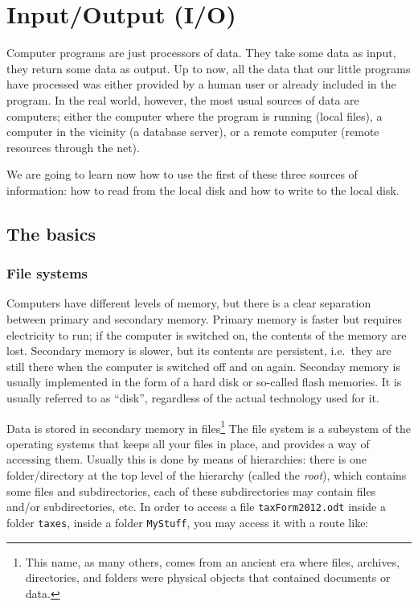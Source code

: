 
\section{Input/Output (I/O)}
\label{sec:inputoutput-io}

Computer programs are just processors of data. They take some data as
input, they return some data as output. Up to now, all the data that
our little programs have processed was either provided by a human user
or already included in the program. In the real world, however, the
most usual sources of data are computers; either the computer where
the program is running (local files), a computer in the vicinity (a
database server), or a remote computer (remote resources through the
net). 

We are going to learn now how to use the first of these three sources
of information: how to read from the local disk and how to write to
the local disk. 

\subsection{The basics}
\label{sec:basics}

\subsubsection*{File systems}
\label{sec:filesystems}

Computers have different levels of memory, but there is a clear
separation between primary and secondary memory. Primary memory is
faster but requires electricity to run; if the computer is switched
on, the contents of the memory are lost. Secondary memory is slower,
but its contents are persistent, i.e.~they are still there when the
computer is switched off and on again. Seconday memory is usually
implemented in the form of a hard disk or so-called flash
memories. It is usually referred to as ``disk'', regardless of the
actual technology used for it. 

Data is stored in secondary memory in files\footnote{This name, as
  many others, comes from an ancient era where files, archives,
  directories, and folders were physical objects that contained
  documents or data.}  
The file system is a subsystem of the operating
systems that keeps all your files in place, and provides a way of
accessing them. Usually this is done by means of hierarchies: there is
one folder/directory at the top level of the hierarchy (called the
\emph{root}), which contains some files and subdirectories, each of
these subdirectories may contain files and/or subdirectories, etc. In
order to access a file \verb+taxForm2012.odt+ inside a folder
\verb+taxes+, inside a folder \verb+MyStuff+, you may access it with a
route like: 

